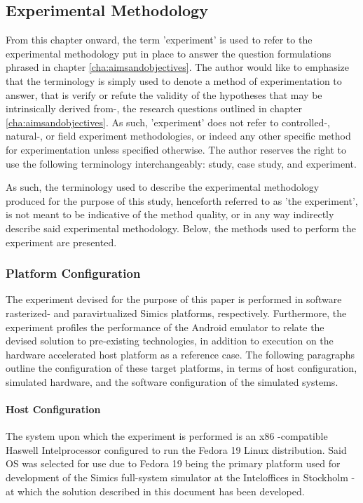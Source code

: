 \subsection{Experimental Methodology}
\label{sec:experimentalmethodology}
From this chapter onward, the term 'experiment' is used to refer to the experimental methodology put in place to answer the question formulations phrased in chapter \ref{cha:aimsandobjectives}.
The author would like to emphasize that the terminology is simply used to denote a method of experimentation to answer, that is verify or refute the validity of the hypotheses that may be intrinsically derived from-, the research questions outlined in chapter \ref{cha:aimsandobjectives}.
As such, 'experiment' does not refer to controlled-, natural-, or field experiment methodologies, or indeed any other specific method for experimentation unless specified otherwise.
The author reserves the right to use the following terminology interchangeably: study, case study, and experiment.

As such, the terminology used to describe the experimental methodology produced for the purpose of this study, henceforth referred to as 'the experiment', is not meant to be indicative of the method quality, or in any way indirectly describe said experimental methodology.
Below, the methods used to perform the experiment are presented.

\subsubsection{Platform Configuration}
\label{sec:experimentalmethodology_platformconfiguration}
The experiment devised for the purpose of this paper is performed in software rasterized- and paravirtualized Simics platforms, respectively.
Furthermore, the experiment profiles the performance of the Android emulator to relate the devised solution to pre-existing technologies, in addition to execution on the hardware accelerated host platform as a reference case.
The following paragraphs outline the configuration of these target platforms, in terms of host configuration, simulated hardware, and the software configuration of the simulated systems.

\paragraph{Host Configuration}
\label{par:experimentalmethodology_platformconfiguration_hostconfiguration}
The system upon which the experiment is performed is an x86 -compatible Haswell Intel\circledR processor configured to run the Fedora 19 Linux distribution.
Said OS was selected for use due to Fedora 19 being the primary platform used for development of the Simics full-system simulator at the Intel\circledR offices in Stockholm - at which the solution described in this document has been developed.

